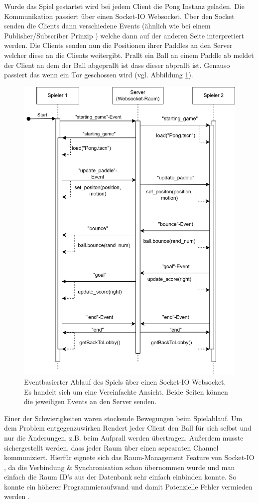 \documentclass[
]{article}
\begin{document}
Wurde das Spiel gestartet wird bei jedem Client die Pong Instanz geladen. Die Kommunikation passiert über einen Socket-IO Websocket. Über den Socket senden die Clients dann verschiedene Events (ähnlich wie bei einem Publisher/Subscriber Prinzip \cite{tanenbaum2007distributed}) welche dann auf der anderen Seite interpretiert werden. Die Clients senden nun die Positionen ihrer Paddles an den Server welcher diese an die Clients weitergibt. Prallt ein Ball an einem Paddle ab meldet der Client an dem der Ball abgeprallt ist dass dieser abprallt ist. Genauso passiert das wenn ein Tor geschossen wird (vgl. Abbildung \ref{fig:ablaufdiagramm-spiel}). 
\begin{figure}[H]
	\centering
	\includegraphics[width=\textwidth -80pt ]{resources/Event-Based-Spielablauf.png}
	\caption{Eventbasierter Ablauf des Spiels über einen Socket-IO Websocket. Es handelt sich um eine Vereinfachte Ansicht. Beide Seiten können die jeweiligen Events an den Server senden.}
	\label{fig:ablaufdiagramm-spiel}
\end{figure}
Einer der Schwierigkeiten waren \glqq stockende\grqq{} Bewegungen beim Spielablauf. Um dem Problem entgegenzuwirken Rendert jeder Client den Ball für sich selbst und nur die Änderungen, z.B. beim Aufprall werden übertragen. 
Außerdem musste sichergestellt werden, dass jeder Raum über einen sepearaten Channel kommuniziert. Hierfür eignete sich das Raum-Management Feature von Socket-IO , da die Verbindung \& Synchronisation schon übernommen wurde und man einfach die Raum ID's aus der Datenbank sehr einfach einbinden konnte. So konnte ein höherer Programmieraufwand und damit Potenzielle Fehler vermieden werden \cite{SocketIORooms}. 
\end{document}
